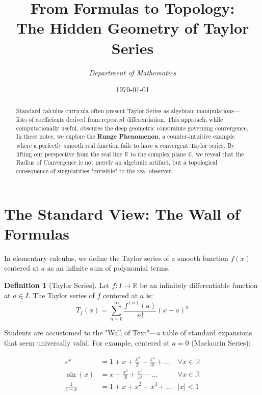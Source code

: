 \documentclass[11pt, letterpaper]{article}
\title{\textbf{From Formulas to Topology: \\ The Hidden Geometry of Taylor Series}}
\author{\textit{Department of Mathematics}}
\date{\today}
\theoremstyle{definition}
\newtheorem{definition}{Definition}[section]
\theoremstyle{remark}
\newcommand{\R}{\mathbb{R}}
\newcommand{\C}{\mathbb{C}}
\begin{document}
\maketitle

\begin{abstract}
    Standard calculus curricula often present Taylor Series as algebraic manipulations—lists of coefficients derived from repeated differentiation. This approach, while computationally useful, obscures the deep geometric constraints governing convergence. In these notes, we explore the \textbf{Runge Phenomenon}, a counter-intuitive example where a perfectly smooth real function fails to have a convergent Taylor series. By lifting our perspective from the real line $\R$ to the complex plane $\C$, we reveal that the Radius of Convergence is not merely an algebraic artifact, but a topological consequence of singularities "invisible" to the real observer.
\end{abstract}

\tableofcontents

\section{The Standard View: The Wall of Formulas}

In elementary calculus, we define the Taylor series of a smooth function $f(x)$ centered at $a$ as an infinite sum of polynomial terms.

\begin{definition}[Taylor Series]
    Let $f: I \to \R$ be an infinitely differentiable function at $a \in I$. The Taylor series of $f$ centered at $a$ is:
    \begin{equation}
        T_f(x) = \sum_{n=0}^{\infty} \frac{f^{(n)}(a)}{n!} (x-a)^n
    \end{equation}
\end{definition}

Students are accustomed to the "Wall of Text"—a table of standard expansions that seem universally valid. For example, centered at $a=0$ (Maclaurin Series):

\begin{align}
    e^x &= 1 + x + \frac{x^2}{2!} + \frac{x^3}{3!} + \dots & \forall x \in \R \\
    \sin(x) &= x - \frac{x^3}{3!} + \frac{x^5}{5!} - \dots & \forall x \in \R \\
    \frac{1}{1-x} &= 1 + x + x^2 + x^3 + \dots & |x| < 1
\end{align}
\end{document}
